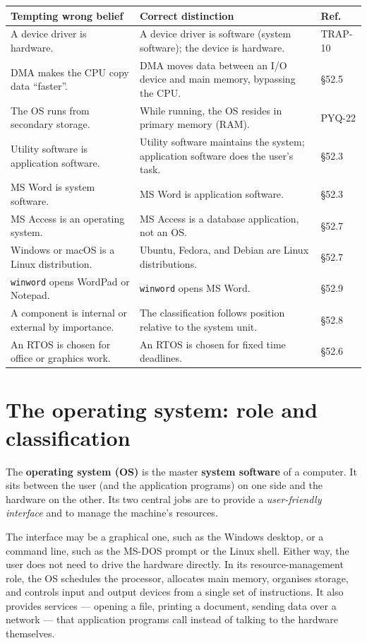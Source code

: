 \begin{center}
\begin{tabular}{p{}p{}p{}}
\toprule
\textbf{Tempting wrong belief} & \textbf{Correct distinction} & \textbf{Ref.} \\
\midrule
A device driver is hardware. & A device driver is software (system software); the device is hardware. & TRAP-10 \\
DMA makes the CPU copy data ``faster''. & DMA moves data between an I/O device and main memory, bypassing the CPU. & \S 52.5 \\
The OS runs from secondary storage. & While running, the OS resides in primary memory (RAM). & PYQ-22 \\
Utility software is application software. & Utility software maintains the system; application software does the user's task. & \S 52.3 \\
MS Word is system software. & MS Word is application software. & \S 52.3 \\
MS Access is an operating system. & MS Access is a database application, not an OS. & \S 52.7 \\
Windows or macOS is a Linux distribution. & Ubuntu, Fedora, and Debian are Linux distributions. & \S 52.7 \\
\texttt{winword} opens WordPad or Notepad. & \texttt{winword} opens MS Word. & \S 52.9 \\
A component is internal or external by importance. & The classification follows position relative to the system unit. & \S 52.8 \\
An RTOS is chosen for office or graphics work. & An RTOS is chosen for fixed time deadlines. & \S 52.6 \\
\bottomrule
\end{tabular}
\end{center}

\section{The operating system: role and classification}
The \textbf{operating system (OS)} is the master \textbf{system software} of a
computer. It sits between the user (and the application programs) on one side
and the hardware on the other. Its two central jobs are to provide a
\emph{user-friendly interface} and to manage the machine's resources.

The interface may be a graphical one, such as the Windows desktop, or a
command line, such as the MS-DOS prompt or the Linux shell. Either way, the
user does not need to drive the hardware directly. In its resource-management
role, the OS schedules the processor, allocates main memory, organises
storage, and controls input and output devices from a single set of
instructions. It also provides services --- opening a file, printing a
document, sending data over a network --- that application programs call
instead of talking to the hardware themselves.

